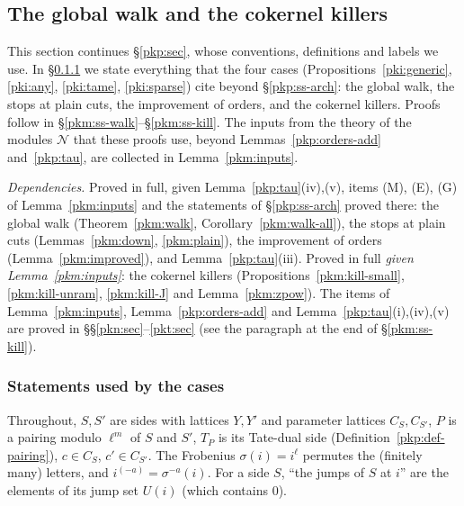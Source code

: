 \documentclass[10pt]{amsart}
\theoremstyle{definition}
\theoremstyle{remark}
\newcommand{\Q}{\mathbb Q}
\begin{document}
\providecommand{\auO}{\mathcal O}
\providecommand{\auQlb}{\overline{\Q}_\ell}
\providecommand{\pkpA}{A_{\mathrm{inf}}}
\providecommand{\pkpW}{W(C^\flat)}
\providecommand{\pkpm}{W(\mathfrak m^\flat)}
\providecommand{\pkpM}{M_m}
\providecommand{\pkpsm}{\mathrm{Sm}_m}
\providecommand{\pkpAmb}{\mathbb A}
\providecommand{\pkmJ}[3]{J^{#1}_{#2}(#3)}
\providecommand{\pkmI}[2]{I_{#1}(#2)}
\providecommand{\pkmv}{v_\ell}

\subsection{The global walk and the cokernel killers}\label{pkm:sec}

This section continues \S\ref{pkp:sec}, whose conventions, definitions and labels we use. In
\S\ref{pkm:ss-state} we state everything that the four cases (Propositions~\ref{pki:generic},
\ref{pki:any}, \ref{pki:tame}, \ref{pki:sparse}) cite beyond \S\ref{pkp:ss-arch}: the global walk,
the stops at plain cuts, the improvement of orders, and the cokernel killers. Proofs follow in
\S\ref{pkm:ss-walk}--\S\ref{pkm:ss-kill}. The inputs from the theory of the modules $\mathcal N$
that these proofs use, beyond Lemmas~\ref{pkp:orders-add} and~\ref{pkp:tau}, are collected in
Lemma~\ref{pkm:inputs}.

\emph{Dependencies.} Proved in full, given Lemma~\ref{pkp:tau}(iv),(v), items (M), (E), (G) of Lemma~\ref{pkm:inputs} and the statements of
\S\ref{pkp:ss-arch} proved there: the global walk (Theorem~\ref{pkm:walk},
Corollary~\ref{pkm:walk-all}), the stops at plain cuts (Lemmas~\ref{pkm:down}, \ref{pkm:plain}), the
improvement of orders (Lemma~\ref{pkm:improved}), and Lemma~\ref{pkp:tau}(iii). Proved in full
\emph{given Lemma~\ref{pkm:inputs}}: the cokernel killers (Propositions~\ref{pkm:kill-small},
\ref{pkm:kill-unram}, \ref{pkm:kill-J} and Lemma~\ref{pkm:zpow}). The items of
Lemma~\ref{pkm:inputs}, Lemma~\ref{pkp:orders-add} and Lemma~\ref{pkp:tau}(i),(iv),(v) are proved in
\S\S\ref{pkn:sec}--\ref{pkt:sec} (see the paragraph at the end of \S\ref{pkm:ss-kill}).

\subsubsection{Statements used by the cases}\label{pkm:ss-state}

Throughout, $S,S'$ are sides with lattices $Y,Y'$ and parameter lattices $C_S,C_{S'}$, $P$ is a
pairing modulo $\ell^m$ of $S$ and $S'$, $T_P$ is its Tate-dual side (Definition~\ref{pkp:def-pairing}),
$c\in C_S$, $c'\in C_{S'}$. The Frobenius $\sigma(i)=i^\ell$ permutes the (finitely many) letters, and
$i^{(-a)}=\sigma^{-a}(i)$. For a side $S$, ``the jumps of $S$ at $i$'' are the elements of its jump
set $U(i)$ (which contains $0$).
\end{document}
